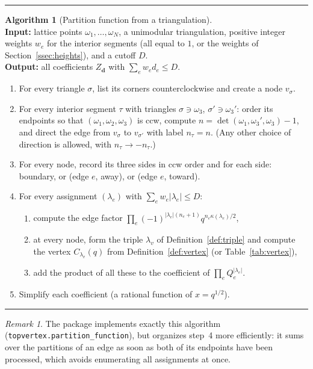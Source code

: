 \documentclass[11pt]{article}
\theoremstyle{plain}
\theoremstyle{definition}
\newtheorem{algo}{Algorithm}
\theoremstyle{remark}
\newtheorem{remark}[theorem]{Remark}
\newenvironment{algobox}{\par\medskip\noindent\begin{minipage}{\linewidth}\hrule\smallskip}{\smallskip\hrule\end{minipage}\par\medskip}
\begin{document}
\begin{algobox}
\begin{algo}[Partition function from a triangulation]\label{alg:gluing}\ \\
\textbf{Input:} lattice points $\omega_1,\ldots,\omega_N$, a unimodular triangulation, positive
integer weights $w_e$ for the interior segments (all equal to $1$, or the weights of
Section~\ref{ssec:heights}), and a cutoff $D$.\\
\textbf{Output:} all coefficients $Z_{\mathbf d}$ with $\sum_ew_ed_e\le D$.
\begin{enumerate}
\item For every triangle $\sigma$, list its corners counterclockwise and create a node $v_\sigma$.
\item For every interior segment $\tau$ with triangles $\sigma\ni\omega_3$, $\sigma'\ni\omega_3'$:
order its endpoints so that $(\omega_1,\omega_2,\omega_3)$ is ccw, compute
$n=\det(\omega_1,\omega_3',\omega_3)-1$, and direct the edge from $v_\sigma$ to $v_{\sigma'}$ with
label $n_\tau=n$. (Any other choice of direction is allowed, with $n_\tau\rightarrow-n_\tau$.)
\item For every node, record its three sides in ccw order and for each side: boundary, or
(edge $e$, away), or (edge $e$, toward).
\item For every assignment $(\lambda_e)$ with $\sum_e w_e|\lambda_e|\le D$:
 \begin{enumerate}
 \item compute the edge factor $\prod_e(-1)^{|\lambda_e|(n_e+1)}q^{n_e\kappa(\lambda_e)/2}$,
 \item at every node, form the triple $\lambda_v$ of Definition~\ref{def:triple} and compute the
 vertex $C_{\lambda_v}(q)$ from Definition~\ref{def:vertex} (or Table~\ref{tab:vertex}),
 \item add the product of all these to the coefficient of $\prod_eQ_e^{|\lambda_e|}$.
 \end{enumerate}
\item Simplify each coefficient (a rational function of $x=q^{1/2}$).
\end{enumerate}
\end{algo}
\end{algobox}

\begin{remark}
The package implements exactly this algorithm (\texttt{topvertex.partition\_function}), but
organizes step~4 more efficiently: it sums over the partitions of an edge as soon as both of its
endpoints have been processed, which avoids enumerating all assignments at once.
\end{remark}
\end{document}
